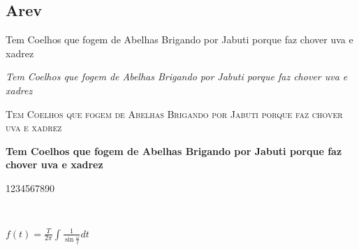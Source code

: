 \documentclass[a4paper]{article}
\newcommand{\frase}{Tem Coelhos que fogem de Abelhas Brigando por Jabuti porque faz chover uva e xadrez}
\newcommand{\funcaoint}{
  f(t) = \frac{T}{2\pi} \int{\frac{1}{\sin\frac{\omega}{t}}}dt
}
\begin{document}
\subsection*{Arev}

\frase

\emph{\frase}

\textsc{\frase}

\textbf{\frase}

1234567890

\

$\funcaoint$
\end{document}
